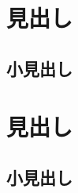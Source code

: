 \documentclass{jsarticle}
\begin{document}
\title{}
\date{\today}
\author{sakurai yoshitaka}
\maketitle

\section{見出し}
\subsection{小見出し}
\section{見出し}
\subsection{小見出し}
\end{document}
